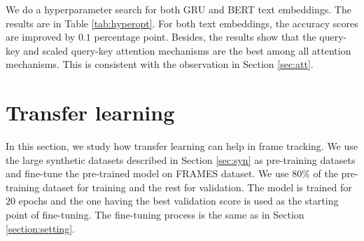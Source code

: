 We do a hyperparameter search for both GRU and BERT text embeddings. The results are in Table \ref{tab:hyperopt}. For both text embeddings, the accuracy scores are improved by $0.1$ percentage point. Besides, the results show that the query-key and scaled query-key attention mechanisms are the best among all attention mechanisms. This is consistent with the observation in Section \ref{sec:att}.

\section{Transfer learning}

\begin{table}
    \centering
    \caption[Accuracy scores with transfer learning]{Accuracy scores with transfer learning. Attention is dot product. The best results in each column are marked bold.\newline}
    \label{tab:transfer}
\end{table}
In this section, we study how transfer learning can help in frame tracking. We use the large synthetic datasets described in Section \ref{sec:syn} as pre-training datasets and fine-tune the pre-trained model on FRAMES dataset. We use $80\%$ of the pre-training dataset for training and the rest for validation. The model is trained for $20$ epochs and the one having the best validation score is used as the starting point of fine-tuning. The fine-tuning process is the same as in Section \ref{section:setting}.

